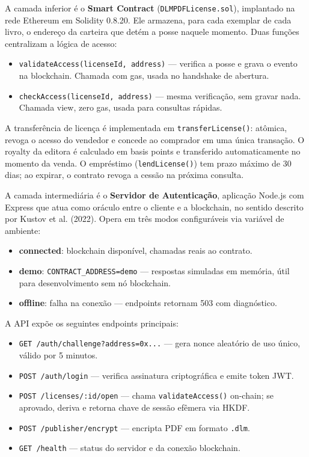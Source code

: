 \documentclass[12pt]{article}
\begin{document}
A camada inferior é o \textbf{Smart Contract} (\texttt{DLMPDFLicense.sol}), implantado na rede Ethereum em Solidity 0.8.20. Ele armazena, para cada exemplar de cada livro, o endereço da carteira que detém a posse naquele momento. Duas funções centralizam a lógica de acesso:

\begin{itemize}
    \item \texttt{validateAccess(licenseId, address)} — verifica a posse e grava o evento na blockchain. Chamada com gas, usada no handshake de abertura.
    \item \texttt{checkAccess(licenseId, address)} — mesma verificação, sem gravar nada. Chamada view, zero gas, usada para consultas rápidas.
\end{itemize}

A transferência de licença é implementada em \texttt{transferLicense()}: atômica, revoga o acesso do vendedor e concede ao comprador em uma única transação. O royalty da editora é calculado em basis points e transferido automaticamente no momento da venda. O empréstimo (\texttt{lendLicense()}) tem prazo máximo de 30 dias; ao expirar, o contrato revoga a cessão na próxima consulta.

A camada intermediária é o \textbf{Servidor de Autenticação}, aplicação Node.js com Express que atua como oráculo entre o cliente e a blockchain, no sentido descrito por Kustov et al. (2022). Opera em três modos configuráveis via variável de ambiente:

\begin{itemize}
    \item \textbf{connected}: blockchain disponível, chamadas reais ao contrato.
    \item \textbf{demo}: \texttt{CONTRACT\_ADDRESS=demo} — respostas simuladas em memória, útil para desenvolvimento sem nó blockchain.
    \item \textbf{offline}: falha na conexão — endpoints retornam 503 com diagnóstico.
\end{itemize}

A API expõe os seguintes endpoints principais:

\begin{itemize}
    \item \texttt{GET /auth/challenge?address=0x...} — gera nonce aleatório de uso único, válido por 5 minutos.
    \item \texttt{POST /auth/login} — verifica assinatura criptográfica e emite token JWT.
    \item \texttt{POST /licenses/:id/open} — chama \texttt{validateAccess()} on-chain; se aprovado, deriva e retorna chave de sessão efêmera via HKDF.
    \item \texttt{POST /publisher/encrypt} — encripta PDF em formato \texttt{.dlm}.
    \item \texttt{GET /health} — status do servidor e da conexão blockchain.
\end{itemize}
\end{document}
